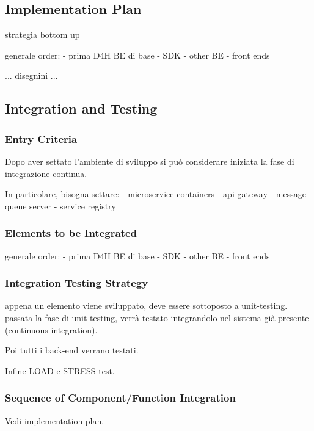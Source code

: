 \subsection{Implementation Plan}
strategia bottom up

generale order:
- prima D4H BE di base
- SDK
- other BE
- front ends

... disegnini ...

\subsection{Integration and Testing}
\subsubsection{Entry Criteria}
Dopo aver settato l'ambiente di sviluppo si può considerare iniziata la fase di integrazione continua.

In particolare, bisogna settare:
- microservice containers
- api gateway
- message queue server
- service registry

\subsubsection{Elements to be Integrated}
generale order:
- prima D4H BE di base
- SDK
- other BE
- front ends

\subsubsection{Integration Testing Strategy}
appena un elemento viene sviluppato, deve essere sottoposto a unit-testing. passata la fase di unit-testing, verrà testato integrandolo nel sistema già presente (continuous integration).

Poi tutti i back-end verrano testati.

Infine LOAD e STRESS test.

\subsubsection{Sequence of Component/Function Integration}
Vedi implementation plan.

